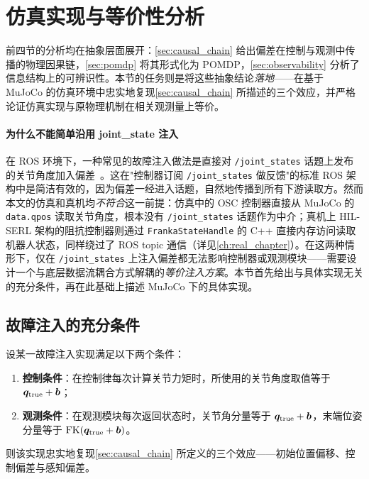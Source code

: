\section{仿真实现与等价性分析}\label{sec:sim_implementation}

前四节的分析均在抽象层面展开：\cref{sec:causal_chain} 给出偏差在控制与观测中传播的物理因果链，\cref{sec:pomdp} 将其形式化为 POMDP，\cref{sec:observability} 分析了信息结构上的可辨识性。本节的任务则是将这些抽象结论\emph{落地}——在基于 MuJoCo 的仿真环境中忠实地复现\cref{sec:causal_chain} 所描述的三个效应，并严格论证仿真实现与原物理机制在相关观测量上等价。

\paragraph{为什么不能简单沿用 joint\_state 注入} 在 ROS 环境下，一种常见的故障注入做法是直接对 \texttt{/joint\_states} 话题上发布的关节角度加入偏差~\cite{ma2023case}。这在"控制器订阅 \texttt{/joint\_states} 做反馈"的标准 ROS 架构中是简洁有效的，因为偏差一经进入话题，自然地传播到所有下游读取方。然而本文的仿真和真机均\emph{不符合}这一前提：仿真中的 OSC 控制器直接从 MuJoCo 的 \texttt{data.qpos} 读取关节角度，根本没有 \texttt{/joint\_states} 话题作为中介；真机上 HIL-SERL 架构的阻抗控制器则通过 \texttt{FrankaStateHandle} 的 C++ 直接内存访问读取机器人状态，同样绕过了 ROS topic 通信（详见\cref{ch:real_chapter}）。在这两种情形下，仅在 \texttt{/joint\_states} 上注入偏差都无法影响控制器或观测模块——需要设计一个与底层数据流耦合方式解耦的\emph{等价注入方案}。本节首先给出与具体实现无关的充分条件，再在此基础上描述 MuJoCo 下的具体实现。

\subsection{故障注入的充分条件}\label{subsec:injection_sufficient}

\begin{proposition}[故障注入的充分条件]\label{prop:injection}
设某一故障注入实现满足以下两个条件：
\begin{enumerate}
  \item[\textbf{\textup{(C1)}}] \textbf{控制条件}：在控制律每次计算关节力矩时，所使用的关节角度取值等于 $\bm{q}_{\text{true}} + \bm{b}$；
  \item[\textbf{\textup{(C2)}}] \textbf{观测条件}：在观测模块每次返回状态时，关节角分量等于 $\bm{q}_{\text{true}} + \bm{b}$，末端位姿分量等于 $\text{FK}(\bm{q}_{\text{true}} + \bm{b})$。
\end{enumerate}
则该实现忠实地复现\cref{sec:causal_chain} 所定义的三个效应——初始位置偏移、控制偏差与感知偏差。
\end{proposition}

